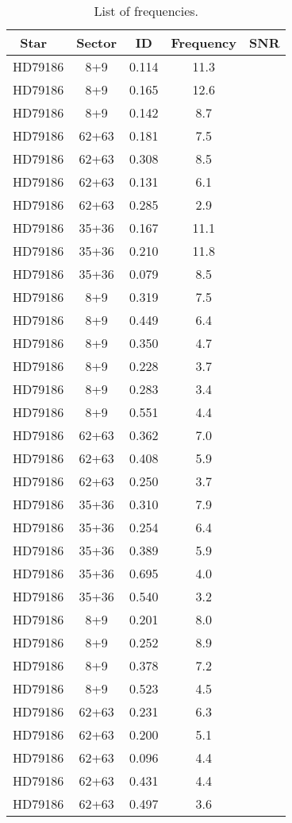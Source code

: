 \begin{table*}
\caption{\label{sample} List of frequencies.}
\begin{tabular}{l c c c c}
\hline\
Star & Sector & ID & Frequency & SNR\\
\hline
HD79186 & 8+9 & 0.114 & 11.3\\ 
HD79186 & 8+9 & 0.165 & 12.6\\ 
HD79186 & 8+9 & 0.142 & 8.7\\ 
HD79186 & 62+63 & 0.181 & 7.5\\ 
HD79186 & 62+63 & 0.308 & 8.5\\ 
HD79186 & 62+63 & 0.131 & 6.1\\ 
HD79186 & 62+63 & 0.285 & 2.9\\ 
HD79186 & 35+36 & 0.167 & 11.1\\ 
HD79186 & 35+36 & 0.210 & 11.8\\ 
HD79186 & 35+36 & 0.079 & 8.5\\ 
HD79186 & 8+9 & 0.319 & 7.5\\ 
HD79186 & 8+9 & 0.449 & 6.4\\ 
HD79186 & 8+9 & 0.350 & 4.7\\ 
HD79186 & 8+9 & 0.228 & 3.7\\ 
HD79186 & 8+9 & 0.283 & 3.4\\ 
HD79186 & 8+9 & 0.551 & 4.4\\ 
HD79186 & 62+63 & 0.362 & 7.0\\ 
HD79186 & 62+63 & 0.408 & 5.9\\ 
HD79186 & 62+63 & 0.250 & 3.7\\ 
HD79186 & 35+36 & 0.310 & 7.9\\ 
HD79186 & 35+36 & 0.254 & 6.4\\ 
HD79186 & 35+36 & 0.389 & 5.9\\ 
HD79186 & 35+36 & 0.695 & 4.0\\ 
HD79186 & 35+36 & 0.540 & 3.2\\ 
HD79186 & 8+9 & 0.201 & 8.0\\ 
HD79186 & 8+9 & 0.252 & 8.9\\ 
HD79186 & 8+9 & 0.378 & 7.2\\ 
HD79186 & 8+9 & 0.523 & 4.5\\ 
HD79186 & 62+63 & 0.231 & 6.3\\ 
HD79186 & 62+63 & 0.200 & 5.1\\ 
HD79186 & 62+63 & 0.096 & 4.4\\ 
HD79186 & 62+63 & 0.431 & 4.4\\ 
HD79186 & 62+63 & 0.497 & 3.6\\ 

\end{tabular}
\end{table*}
